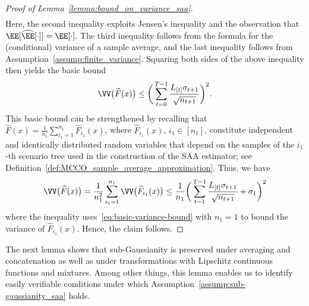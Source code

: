 \documentclass[11pt]{article}
\let\hat\widehat
\begin{document}
\begin{proof}[Proof of Lemma~\ref{lemma:bound_on_variance_saa}]
\begin{align*}
\end{align*}
Here, the second inequality exploits Jensen's inequality and the observation that $\EE[\hat\EE[\cdot]] = \EE[\cdot]$. The third inequality follows from the formula for the (conditional) variance of a sample average, and the last inequality follows from Assumption~\ref{assump:finite_variance}. Squaring both sides of the above inequality then yields the basic bound
\begin{align}
    \label{eq:basic-variance-bound}
    \VV \big( \hat{F}(x) \big) \leq  \bigg(\sum_{t=0}^{T-1} \frac{L_{[t]}\sigma_{t+1}}{\sqrt{n_{t+1}}}\bigg)^2.
\end{align}
This basic bound can be strengthened by recalling that $\hat F(x)=\frac{1}{n_1}\sum_{i_1=1}^{n_1} \hat F_{i_1}(x)$, where $\hat F_{i_1}(x)$, $i_1\in[n_1]$, constitute independent and identically distributed random variables that depend on the samples of the $i_1$-th scenario tree used in the construction of the SAA estimator; see Definition~\ref{def:MCCO_sample_average_approximation}. Thus, we have
\begin{align*}
     \VV \big( \hat{F}(x) \big) =\frac{1}{n_1^2}\sum_{i_1=1}^{n_1} \VV\big(\hat F_{i_1}(x)\big) \leq  \frac{1}{n_1}\bigg(\sum_{t=1}^{T-1} \frac{L_{[t]}\sigma_{t+1}}{\sqrt{n_{t+1}}}+\sigma_1\bigg)^2
\end{align*}
where the inequality uses~\eqref{eq:basic-variance-bound} with $n_1=1$ to bound the variance of $\hat F_{i_1}(x)$. Hence, the claim follows.
\end{proof}

The next lemma shows that sub-Gaussianity is preserved under averaging and concatenation as well as under transformations with Lipschitz continuous functions and mixtures. Among other things, this lemma enables us to identify easily verifiable conditions under which Assumption~\ref{assump:sub-gaussianity_saa} holds.
\end{document}
